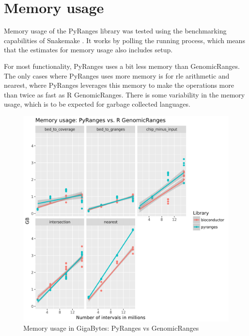 \documentclass[10pt,letterpaper]{article}
\begin{document}
\section*{Memory usage}

Memory usage of the PyRanges library was tested using the benchmarking
capabilities of Snakemake \cite{doi:10.1093/bioinformatics/bty350}. It works by
polling the running process, which means that the estimates for memory usage
also includes setup.

For most functionality, PyRanges uses a bit less memory than GenomicRanges. The
only cases where PyRanges uses more memory is for rle arithmetic and nearest,
where PyRanges leverages this memory to make the operations more than twice as
fast as R GenomicRanges. There is some variability in the memory usage, which is
to be expected for garbage collected languages.

\begin{figure}
\includegraphics[width=1\textwidth]{graphs/memory.png}
\caption{Memory usage in GigaBytes: PyRanges vs GenomicRanges} %
\label{fig1} %
\end{figure} %
\end{document}
